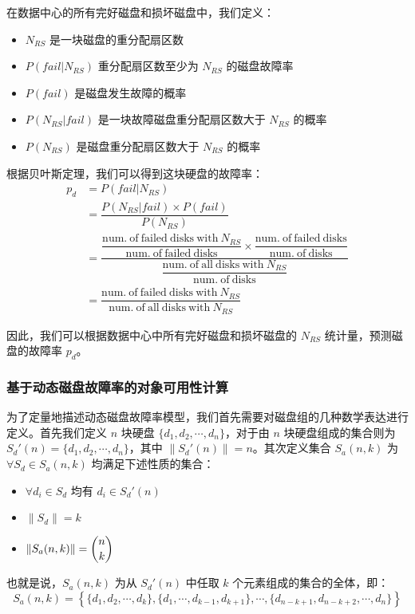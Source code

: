 在数据中心的所有完好磁盘和损坏磁盘中，我们定义：
\begin{itemize}
\item $N_{RS}$ 是一块磁盘的重分配扇区数
\item $P(fail|N_{RS})$ 重分配扇区数至少为 $N_{RS}$ 的磁盘故障率
\item $P(fail)$ 是磁盘发生故障的概率
\item $P(N_{RS}|fail)$ 是一块故障磁盘重分配扇区数大于 $N_{RS}$ 的概率
\item $P(N_{RS})$ 是磁盘重分配扇区数大于 $N_{RS}$ 的概率
\end{itemize}

根据贝叶斯定理，我们可以得到这块硬盘的故障率：
\begin{equation}
\begin{split}
p_d&=P(fail|N_{RS})\\
&=\dfrac{P(N_{RS}|fail){\times}P(fail)}{P(N_{RS})}\\
&=\dfrac{\dfrac{\mathrm{num.\ of\ failed\ disks\ with\ }N_{RS}}{\mathrm{num.\ of\ failed\ disks}}\times\dfrac{\mathrm{num.\ of\ failed\ disks}}{\mathrm{num.\ of\ disks}}}{\dfrac{\mathrm{num.\ of\ all\ disks\ with\ }N_{RS}}{\mathrm{num.\ of\ disks}}}\\
&=\dfrac{\mathrm{num.\ of\ failed\ disks\ with\ }N_{RS}}{\mathrm{num.\ of\ all\ disks\ with\ }N_{RS}}
\end{split}
\end{equation}

因此，我们可以根据数据中心中所有完好磁盘和损坏磁盘的 $N_{RS}$ 统计量，预测磁盘的故障率 $p_d$。
\subsubsection{基于动态磁盘故障率的对象可用性计算}
为了定量地描述动态磁盘故障率模型，我们首先需要对磁盘组的几种数学表达进行定义。首先我们定义 $n$ 块硬盘 $\{d_1,d_2,\cdots,d_n\}$，对于由 $n$ 块硬盘组成的集合则为 $S_{d}'(n)=\{d_1,d_2,\cdots,d_n\}$，其中 $\|S_{d}'(n)\|=n$。其次定义集合 $S_{a}(n,k)$ 为 ${\forall}S_{d}{\in}S_{a}(n,k)$ 均满足下述性质的集合：
\begin{itemize}
\item ${\forall}d_{i}{\in}S_{d}$ 均有 $d_{i}{\in}S_{d}'(n)$
\item $\|S_{d}\|=k$
\item $\|S_{a}(n,k)\|=\dbinom{n}{k}$
\end{itemize}

也就是说，$S_{a}(n,k)$ 为从 $S_{d}'(n)$ 中任取 $k$ 个元素组成的集合的全体，即：
\begin{equation}
S_{a}(n,k)=\left\{\{d_{1},d_{2},\cdots,d_{k}\},\{d_{1},\cdots,d_{k-1},d_{k+1}\},\cdots,\{d_{n-k+1},d_{n-k+2},\cdots,d_{n}\}\right\}
\end{equation}

